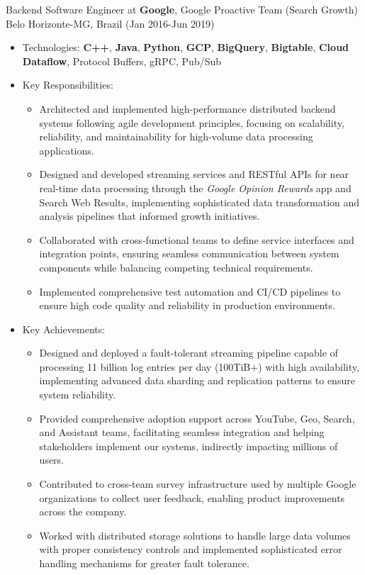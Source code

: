
\normalsize{Backend Software Engineer at \textbf{Google}, Google Proactive Team (Search Growth)}\\
        \scriptsize{Belo Horizonte-MG, Brazil (Jan 2016-Jun 2019)}
\begin{itemize}
    \item \footnotesize{Technologies:}\scriptsize{ \textbf{C++}, \textbf{Java}, \textbf{Python}, \textbf{GCP}, \textbf{BigQuery}, \textbf{Bigtable}, \textbf{Cloud Dataflow}, Protocol Buffers, gRPC, Pub/Sub}
    \item \footnotesize{Key Responsibilities:}
    \begin{itemize}
        \item \scriptsize{Architected and implemented high-performance distributed backend systems following agile development principles, focusing on scalability, reliability, and maintainability for high-volume data processing applications.}
        \item \scriptsize{Designed and developed streaming services and RESTful APIs for near real-time data processing through the \emph{Google Opinion Rewards} app and Search Web Results, implementing sophisticated data transformation and analysis pipelines that informed growth initiatives.}
        \item \scriptsize{Collaborated with cross-functional teams to define service interfaces and integration points, ensuring seamless communication between system components while balancing competing technical requirements.}
        \item \scriptsize{Implemented comprehensive test automation and CI/CD pipelines to ensure high code quality and reliability in production environments.}
    \end{itemize}
    \item \footnotesize{Key Achievements:}
    \begin{itemize}
        \item \scriptsize{Designed and deployed a fault-tolerant streaming pipeline capable of processing 11 billion log entries per day (100TiB+) with high availability, implementing advanced data sharding and replication patterns to ensure system reliability.}
        \item \scriptsize{Provided comprehensive adoption support across YouTube, Geo, Search, and Assistant teams, facilitating seamless integration and helping stakeholders implement our systems, indirectly impacting millions of users.}
        \item \scriptsize{Contributed to cross-team survey infrastructure used by multiple Google organizations to collect user feedback, enabling product improvements across the company.}
        \item \scriptsize{Worked with distributed storage solutions to handle large data volumes with proper consistency controls and implemented sophisticated error handling mechanisms for greater fault tolerance.}
    \end{itemize}
\end{itemize}
